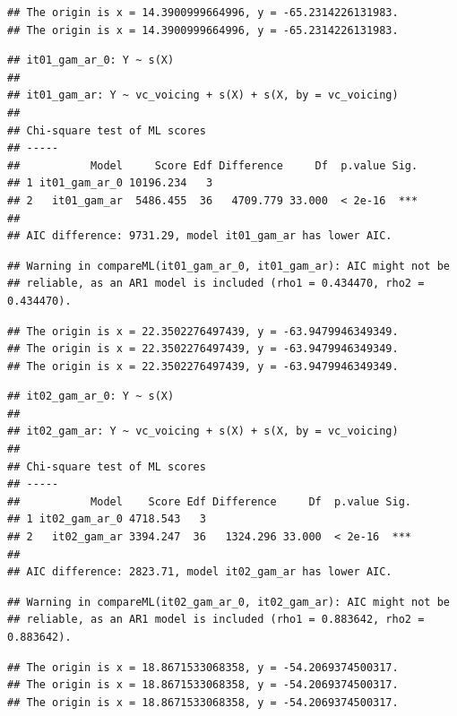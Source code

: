 \documentclass[12pt,]{article}
\begin{document}
\begin{verbatim}
## The origin is x = 14.3900999664996, y = -65.2314226131983.
## The origin is x = 14.3900999664996, y = -65.2314226131983.
\end{verbatim}

\begin{verbatim}
## it01_gam_ar_0: Y ~ s(X)
## 
## it01_gam_ar: Y ~ vc_voicing + s(X) + s(X, by = vc_voicing)
## 
## Chi-square test of ML scores
## -----
##           Model     Score Edf Difference     Df  p.value Sig.
## 1 it01_gam_ar_0 10196.234   3                                
## 2   it01_gam_ar  5486.455  36   4709.779 33.000  < 2e-16  ***
## 
## AIC difference: 9731.29, model it01_gam_ar has lower AIC.
\end{verbatim}

\begin{verbatim}
## Warning in compareML(it01_gam_ar_0, it01_gam_ar): AIC might not be
## reliable, as an AR1 model is included (rho1 = 0.434470, rho2 = 0.434470).
\end{verbatim}

\begin{verbatim}
## The origin is x = 22.3502276497439, y = -63.9479946349349.
## The origin is x = 22.3502276497439, y = -63.9479946349349.
## The origin is x = 22.3502276497439, y = -63.9479946349349.
\end{verbatim}

\begin{verbatim}
## it02_gam_ar_0: Y ~ s(X)
## 
## it02_gam_ar: Y ~ vc_voicing + s(X) + s(X, by = vc_voicing)
## 
## Chi-square test of ML scores
## -----
##           Model    Score Edf Difference     Df  p.value Sig.
## 1 it02_gam_ar_0 4718.543   3                                
## 2   it02_gam_ar 3394.247  36   1324.296 33.000  < 2e-16  ***
## 
## AIC difference: 2823.71, model it02_gam_ar has lower AIC.
\end{verbatim}

\begin{verbatim}
## Warning in compareML(it02_gam_ar_0, it02_gam_ar): AIC might not be
## reliable, as an AR1 model is included (rho1 = 0.883642, rho2 = 0.883642).
\end{verbatim}

\begin{verbatim}
## The origin is x = 18.8671533068358, y = -54.2069374500317.
## The origin is x = 18.8671533068358, y = -54.2069374500317.
## The origin is x = 18.8671533068358, y = -54.2069374500317.
\end{verbatim}
\end{document}
